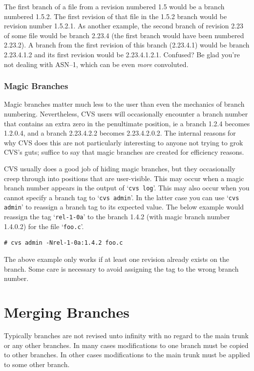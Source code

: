 \documentclass[12pt,letterpaper]{article}
\newcommand{\cmd}[1]{`\texttt{#1}'}
\begin{document}
The first branch of a file from a revision numbered 1.5 would be a branch
numbered 1.5.2.  The first revision of that file in the 1.5.2 branch would be
revision number 1.5.2.1.  As another example, the second branch of revision
2.23 of some file would be branch 2.23.4 (the first branch would have been
numbered 2.23.2).  A branch from the first revision of this branch (2.23.4.1)
would be branch 2.23.4.1.2 and its first revision would be 2.23.4.1.2.1.
Confused?  Be glad you're not dealing with ASN--1, which can be even
\emph{more} convoluted.

\subsubsection{Magic Branches}

Magic branches matter much less to the user than even the mechanics of branch
numbering.  Nevertheless, CVS users will occasionally encounter a branch
number that contains an extra zero in the penultimate position, ie a branch
1.2.4 becomes 1.2.0.4, and a branch 2.23.4.2.2 becomes 2.23.4.2.0.2.  The
internal reasons for why CVS does this are not particularly interesting to
anyone not trying to grok CVS's guts; suffice to say that magic branches are
created for efficiency reasons.

CVS usually does a good job of hiding magic branches, but they occasionally
creep through into positions that are user-visible.  This may occur when a
magic branch number appears in the output of \cmd{cvs log}.  This may also
occur when you cannot specify a branch tag to \cmd{cvs admin}.  In the latter
case you can use \cmd{cvs admin} to reassign a branch tag to its expected
value.  The below example would reassign the tag \cmd{rel-1-0a} to the branch
1.4.2 (with magic branch number 1.4.0.2) for the file \cmd{foo.c}.


\begin{Verbatim}
# cvs admin -Nrel-1-0a:1.4.2 foo.c
\end{Verbatim}

The above example only works if at least one revision already exists on the
branch.  Some care is necessary to avoid assigning the tag to the wrong branch
number.



\section{Merging Branches}

Typically branches are not revised unto infinity with no regard to the main
trunk or any other branches.  In many cases modifications to one branch must
be copied to other branches.  In other cases modifications to the main trunk
must be applied to some other branch.
\end{document}
